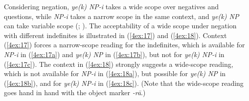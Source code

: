 \documentclass[output=paper]{langsci/langscibook}
\begin{document}
Considering negation, {\emph{ye(k) NP-i}} takes a wide scope over negatives and questions, while {\emph{NP-i}} takes a narrow scope in the same context, and {\emph{ye(k) NP}} can take variable scope (\citealt[][8-9]{toosarvandani:nasser:17}; \citealt[][26-30]{modarresi:14}). The acceptability of a wide scope under negation with different indefinites is illustrated in (\ref{4ex:17}) and (\ref{4ex:18}). Context (\ref{4ex:17}) forces a narrow-scope reading for the indefinites, which is available for {\emph{NP-i}} in (\ref{4ex:17a}) and {\emph{ye(k) NP}} in (\ref{4ex:17b}), but not for {\emph{ye(k) NP-i}} in (\ref{4ex:17c}). The context in (\ref{4ex:18}) strongly suggests a wide-scope reading, which is not available for {\emph{NP-i}} in (\ref{4ex:18a}), but possible for {\emph{ye(k) NP}} in (\ref{4ex:18b}), and for {\emph{ye(k) NP-i}} in (\ref{4ex:18c}). (Note that the wide-scope reading goes hand in hand with the object marker {\emph{-rā}}.)
\end{document}
